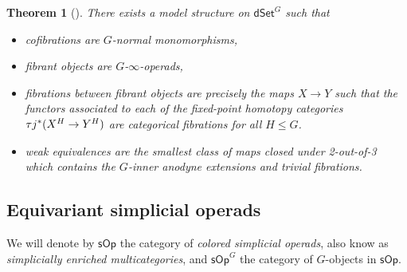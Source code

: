 \documentclass[a4paper,10pt
,draft
]{article}%
\numberwithin{equation}{section}
\numberwithin{figure}{section}
\newtheorem{theorem}[equation]{Theorem}%
\theoremstyle{definition} %
\newcommand{\sOp}{\ensuremath{\mathsf{sOp}}}%
\newcommand{\dSet}{\mathsf{dSet}}
\newcommand{\1}{\ensuremath{\mathbbm 1}}%
\begin{document}
\begin{theorem}[{\cite[Thm 2.1, Thm 8.22]{Per18}}]
      There exists a model structure on $\dSet^G$ such that
      \begin{itemize}
      \item cofibrations are $G$-normal monomorphisms,
      \item fibrant objects are $G$-$\infty$-operads,
      \item fibrations between fibrant objects are precisely the maps $X \to Y$ such that the functors associated to each of the fixed-point homotopy categories $\tau j^{\**}(X^H \to Y^H)$ are categorical fibrations for all $H \leq G$.
      \item weak equivalences are the smallest class of maps closed under 2-out-of-3 which
            contains the $G$-inner anodyne extensions and trivial fibrations.
      \end{itemize}
\end{theorem}







\subsection{Equivariant simplicial operads}


We will denote by $\mathsf{sOp}$ the category of \textit{colored simplicial operads}, also know as \textit{simplicially enriched multicategories},
and $\mathsf{sOp}^G$ the category of $G$-objects in $\sOp$.
\end{document}
